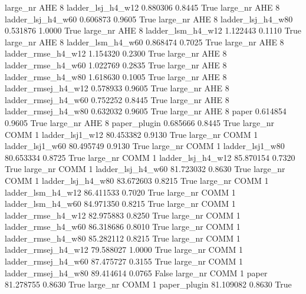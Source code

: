   large_nr      AHE                 8   ladder_lsj_h4_w12    0.880306      0.8445    True
  large_nr      AHE                 8   ladder_lsj_h4_w60    0.606873      0.9605    True
  large_nr      AHE                 8   ladder_lsj_h4_w80    0.531876      1.0000    True
  large_nr      AHE                 8   ladder_lsm_h4_w12    1.122443      0.1110    True
  large_nr      AHE                 8   ladder_lsm_h4_w60    0.868474      0.7025    True
  large_nr      AHE                 8  ladder_rmse_h4_w12    1.154320      0.2300    True
  large_nr      AHE                 8  ladder_rmse_h4_w60    1.022769      0.2835    True
  large_nr      AHE                 8  ladder_rmse_h4_w80    1.618630      0.1005    True
  large_nr      AHE                 8 ladder_rmsej_h4_w12    0.578933      0.9605    True
  large_nr      AHE                 8 ladder_rmsej_h4_w60    0.752252      0.8445    True
  large_nr      AHE                 8 ladder_rmsej_h4_w80    0.632032      0.9605    True
  large_nr      AHE                 8               paper    0.614854      0.9605    True
  large_nr      AHE                 8        paper_plugin    0.685666      0.8445    True
  large_nr     COMM                 1     ladder_lsj1_w12   80.453382      0.9130    True
  large_nr     COMM                 1     ladder_lsj1_w60   80.495749      0.9130    True
  large_nr     COMM                 1     ladder_lsj1_w80   80.653334      0.8725    True
  large_nr     COMM                 1   ladder_lsj_h4_w12   85.870154      0.7320    True
  large_nr     COMM                 1   ladder_lsj_h4_w60   81.723032      0.8630    True
  large_nr     COMM                 1   ladder_lsj_h4_w80   83.672603      0.8215    True
  large_nr     COMM                 1   ladder_lsm_h4_w12   86.411533      0.7020    True
  large_nr     COMM                 1   ladder_lsm_h4_w60   84.971350      0.8215    True
  large_nr     COMM                 1  ladder_rmse_h4_w12   82.975883      0.8250    True
  large_nr     COMM                 1  ladder_rmse_h4_w60   86.318686      0.8010    True
  large_nr     COMM                 1  ladder_rmse_h4_w80   85.282112      0.8215    True
  large_nr     COMM                 1 ladder_rmsej_h4_w12   79.588027      1.0000    True
  large_nr     COMM                 1 ladder_rmsej_h4_w60   87.475727      0.3155    True
  large_nr     COMM                 1 ladder_rmsej_h4_w80   89.414614      0.0765   False
  large_nr     COMM                 1               paper   81.278755      0.8630    True
  large_nr     COMM                 1        paper_plugin   81.109082      0.8630    True
